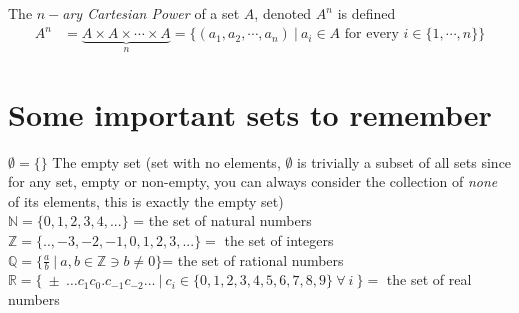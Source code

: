 \begin{definition}
    The \textit{$n-$ary Cartesian Power} of a set $A$, denoted $A^n$ is defined
    \begin{align}
        A^n &= \underbrace{A\times A \times \cdots \times A}_{n} = \{(a_1, a_2, \cdots, a_n) \ | \ a_i \in A \text{ for every } i \in \{1, \cdots, n\}\} \nonumber
    \end{align}
\end{definition}
\newpage
\noindent\section{Some important sets to remember}

$\emptyset=\{\}$ The empty set (set with no elements, $\emptyset$ is trivially a subset of all sets since for any set, empty or non-empty, you can always consider the collection of \textit{none} of its elements, this is exactly the empty set) \index{$\emptyset$} \index{$\{\}$}\\
$\mathbb{N}=\{0, 1,2,3,4,...\}$  = the set of natural numbers\\ 
$\mathbb{Z}=\{..,-3,-2,-1,0,1,2,3,...\}=$ the set of integers\\
$\mathbb{Q}=\{\frac{a}{b} \ | \  a,b \in \mathbb{Z} \ni b\neq 0\}$= the set of rational numbers \\
$\mathbb{R}=\{\ \pm \ \dots c_1c_0.c_{-1}c_{-2}\dots \  | \ c_i\in \{0,1,2,3,4,5,6,7,8,9\} \ \forall  \ i  \ \}=$ the set of real numbers

